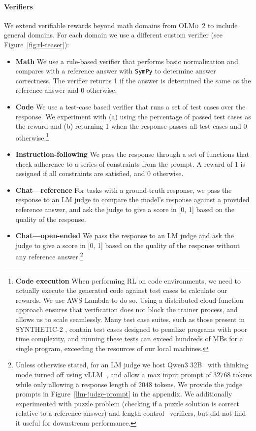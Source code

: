\documentclass[table]{ai2style/ai2}
\newcommand{\oldOlmo}{OLMo\xspace}
\newcommand{\olmotoo}{\textsc{\oldOlmo~2}\xspace}
\begin{document}
\paragraph{Verifiers}
We extend verifiable rewards beyond math domains from \olmotoo to include general domains.
For each domain we use a different custom verifier (see Figure~\ref{fig:rl-teaser}):
\begin{itemize}
    \item {\bf{Math}} We use a rule-based verifier that performs basic normalization and compares with a reference answer with \texttt{SymPy} to determine answer correctness. The verifier returns 1 if the answer is determined the same as the reference answer and 0 otherwise.
    \item {\bf{Code}} We use a test-case based verifier that runs a set of test cases over the response. We experiment with (a) using the percentage of passed test cases as the reward and (b) returning 1 when the response passes all test cases and 0 otherwise.\footnote{{\bf Code execution} When performing RL on code environments, we need to actually execute the generated code against test cases to calculate our rewards. We use AWS Lambda to do so. Using a distributed cloud function approach ensures that verification does not block the trainer process, and allows us to scale seamlessly. Many test case suites, such as those present in SYNTHETIC-2 \citep{primeintellect2025synthetic2}, contain test cases designed to penalize programs with poor time complexity, and running these tests can exceed hundreds of MBs for a single program, exceeding the resources of our local machines.}
    \item {\bf{Instruction-following}} We pass the response through a set of functions that check adherence to a series of constraints from the prompt. A reward of 1 is assigned if all constraints are satisfied, and 0 otherwise.
    \item {\bf{Chat---reference}} For tasks with a ground-truth response, we pass the response to an LM judge to compare the model's response against a provided reference answer, and ask the judge to give a score in [0, 1] based on the quality of the response.
    \item {\bf{Chat---open-ended}} We pass the response to an LM judge and ask the judge to give a score in [0, 1] based on the quality of the response without any reference answer.\footnote{Unless otherwise stated, for an LM judge we host Qwen3 32B~\citep{qwen3} with thinking mode turned off using vLLM~\citep{vllm}, and allow a max input prompt of 32768 tokens while only allowing a response length of 2048 tokens. We provide the judge prompts in Figure~\ref{llm-judge-prompt} in the appendix.
    We additionally experimented with puzzle problem (checking if a puzzle solution is correct relative to a reference answer) and length-control~\citep{aggarwal2025l1controllinglongreasoning} verifiers, but did not find it useful for downstream performance.}
\end{itemize}
\end{document}
